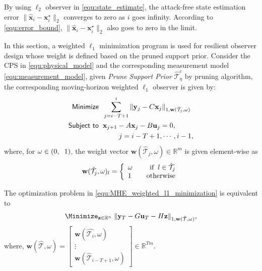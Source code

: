 By using $\ell_2$ observer in \eqref{equ:state_estimate}, the attack-free state estimation error $\|\hat{\mathbf{x}}_i-\mathbf{x}_i^{\star}\|_2$ converges to zero as $i$ goes infinity. According to \eqref{equ:error_bound}, $\|\hat{\mathbf{x}}_i-\mathbf{x}_i^{\star}\|_2$ also goes to zero in the limit.



\iffalse
In this section, a weighted $\ell_1$ minimization program is used for resilient observer design whose weight is defined based on the pruned support prior. Consider the CPS in \eqref{equ:physical_model} and the corresponding measurement model \eqref{equ:measurement_model}, given \emph{Prune Support Prior} $\hat{\mathcal{T}}^{c}_{\eta}$ by pruning algorithm, the corresponding moving-horizon weighted $\ell_1$ observer is given by:
\begin{equation}\label{equ:MHE_weighted_l1_minimization}
    \begin{aligned}
    \textsf{Minimize} &\hspace{2mm} \sum_{j=i-T+1}^i \|\mathbf{y}_j-C\mathbf{x}_j\|_{1,\mathbf{w}(\hat{\mathcal{T}}_j,\omega)}\\
    \textsf{Subject to}& \hspace{2mm} \mathbf{x}_{j+1} -A\mathbf{x}_j - B\mathbf{u}_j =0, \\
    &\hspace{10mm} j = i-T+1, \cdots,i-1,
        \end{aligned}
\end{equation}
where, for $\omega \in\left(0,\hspace{2mm}1\right)$, the weight vector $\mathbf{w}(\hat{\mathcal{T}}_j,\omega) \in\mathbb{R}^m$ is given element-wise as
\begin{align} \label{equ:weight_definition}
    \mathbf{w}(\hat{\mathcal{T}_j},\omega)_l =\left\{
     \begin{array}{lr}
     \omega &\quad\text{if}\hspace{0.2cm} l \in \hat{\mathcal{T}}_j \\
     1 &\quad\text{otherwise}
     \end{array}
     \right.
\end{align}

The optimization problem in \eqref{equ:MHE_weighted_l1_minimization} is equivalent to
 \begin{equation}\label{equ:weighted_l1_minimization}
\begin{aligned}
\Minimize_{\mathbf{z}\in \mathbb{R}^n}\hspace{1mm} \|\mathbf{y}_T -G\mathbf{u}_T - H \mathbf{z}\|_{1, \mathbf{w}(\hat{\mathcal{T}},\omega)},
\end{aligned}    
\end{equation}
where, $\mathbf{w}(\hat{\mathcal{T}},\omega) = \begin{bmatrix}\mathbf{w}(\hat{\mathcal{T}_i},\omega) \\ \vdots \\\mathbf{w}(\hat{\mathcal{T}}_{i-T+1},\omega) \end{bmatrix} \in \mathbb{R}^{Tm}$.

